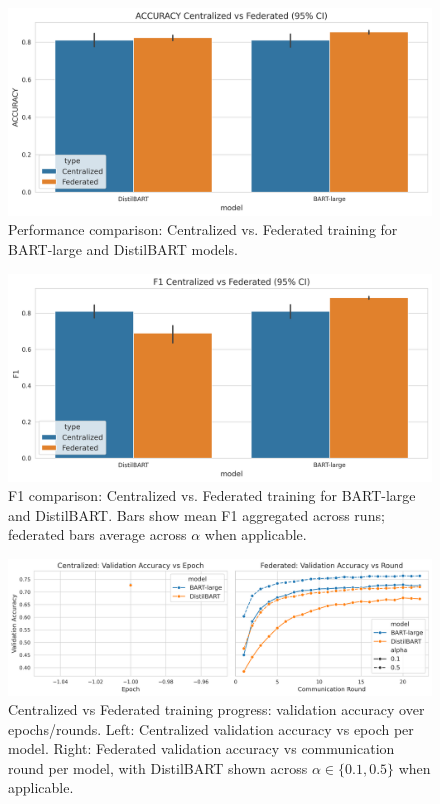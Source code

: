 \documentclass[conference]{IEEEtran}
\begin{document}
\begin{figure}[t]
    \centering
    \includegraphics[width=\columnwidth]{../plots/classification/performance_comparison_accuracy.png}
    \caption{Performance comparison: Centralized vs. Federated training for BART-large and DistilBART models.}
    \label{fig:performance_comparison}
\end{figure}

\begin{figure}[t]
    \centering
    \includegraphics[width=\columnwidth]{../plots/classification/performance_comparison_f1.png}
    \caption{F1 comparison: Centralized vs. Federated training for BART-large and DistilBART. Bars show mean F1 aggregated across runs; federated bars average across $\alpha$ when applicable.}
    \label{fig:performance_comparison_f1}
\end{figure}

\begin{figure}[t]
    \centering
    \includegraphics[width=\columnwidth]{../plots/classification/fed_vs_central_progress.png}
    \caption{Centralized vs Federated training progress: validation accuracy over epochs/rounds. Left: Centralized validation accuracy vs epoch per model. Right: Federated validation accuracy vs communication round per model, with DistilBART shown across $\alpha\in\{0.1,0.5\}$ when applicable.}
    \label{fig:federated_progress}
\end{figure}
\end{document}
